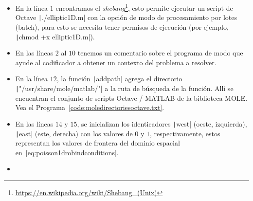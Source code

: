 \begin{problem}
\begin{itemize}
    \item

          En la línea $1$ encontramos el
          \emph{shebang}\footnote{\url{https://en.wikipedia.org/wiki/Shebang_(Unix)}},
          esto permite ejecutar un script de Octave
          \texttt|./elliptic1D.m| con la opción de modo de
          procesamiento por lotes (batch), para esto se necesita
          tener permisos de ejecución (por ejemplo,
          \texttt|chmod +x elliptic1D.m|).

    \item

          En las líneas $2$ al $10$ tenemos un comentario sobre el
          programa de modo que ayude al codificador a obtener un
          contexto del problema a resolver.

    \item

          En la línea $12$, la función
          \href{https://docs.octave.org/v9.3.0/Manipulating-the-Load-Path.html#index-addpath}{\texttt|addpath|}
          agrega el directorio
          \texttt|"/usr/share/mole/matlab/"| a la ruta de
          búsqueda de la función.
          Allí se encuentran el conjunto de scripts Octave / MATLAB
          de la biblioteca MOLE.
          Vea el Programa~\ref{code:moledirectoriesoctave.txt}.

    \item

          En las líneas $14$ y $15$, se inicializan los identicadores
          \texttt|west| (oeste, izquierda),
          \texttt|east| (este, derecha) con los valores
          de $0$ y $1$, respectivamente, estos representan los
          valores de frontera del dominio espacial
          en~\eqref{eq:poisson1drobindconditions}.

    \item


\end{itemize}
\end{problem}
